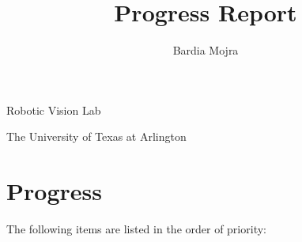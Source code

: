 \documentclass[11pt]{article}
\title{Progress Report}
\author{Bardia Mojra}
\begin{document}
\maketitle
\thispagestyle{empty}

\bigskip
\bigskip
\begin{center}
 Robotic Vision Lab
\end{center}

\begin{center}
The University of Texas at Arlington
\end{center}

\newpage



\section{Progress}
The following items are listed in the order of priority:
\end{document}
